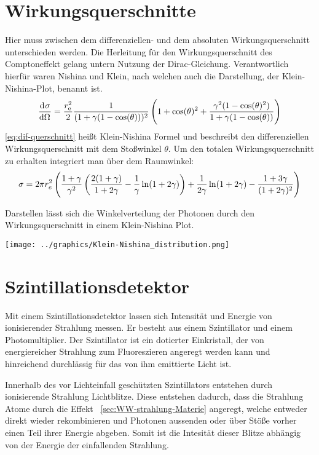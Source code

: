 \documentclass[11pt, ngerman, fleqn, DIV=15, headinclude, BCOR=2cm]{scrreprt}
\begin{document}
\section{Wirkungsquerschnitte}
Hier muss zwischen dem differenziellen- und dem absoluten Wirkungsquerschnitt
unterschieden werden.
Die Herleitung für den Wirkungsquerschnitt des Comptoneffekt gelang untern
Nutzung der Dirac-Gleichung. Verantwortlich hierfür waren Nishina und
Klein, nach welchen auch die Darstellung, der Klein-Nishina-Plot, benannt ist.
\[
    \dod \sigma\Omega = \frac{r^2_\text{e}}{2}
    \frac{1}{(1+\gamma(1-\cos(\theta)))^2}\del{1+\cos(\theta)^2+\frac{\gamma^2(1-\cos(\theta)^2)}{1+\gamma(1-\cos(\theta))}}
\]
\label{eq:dif-querschnitt}
\ref{eq:dif-querschnitt} heißt Klein-Nishina Formel und beschreibt den
differenziellen Wirkungsquerschnitt mit dem Stoßwinkel $\theta$.
Um den totalen Wirkungsquerschnitt zu erhalten integriert man über dem
Raumwinkel:
\[
    \sigma = 2\pi r^2_e
    \del{\frac{1+\gamma}{\gamma^2}\del{\frac{2(1+\gamma)}{1+2\gamma}-\frac
        1\gamma\ln(1+2\gamma)}+\frac
    1{2\gamma}\ln(1+2\gamma)-\frac{1+3\gamma}{(1+2\gamma)^2}}
\]

Darstellen lässt sich die Winkelverteilung der Photonen durch den Wirkungsquerschnitt in einem
Klein-Nishina Plot. 

\texttt{[image: ../graphics/Klein-Nishina\_distribution.png]}
\parencite{klein-nishina}

\section{Szintillationsdetektor}
Mit einem Szintillationsdetektor lassen sich Intensität und Energie von
ionisierender Strahlung messen.
Er besteht aus einem Szintillator und einem Photomultiplier.
Der Szintillator ist ein dotierter Einkristall, der von energiereicher
Strahlung zum Fluoreszieren angeregt werden kann und hinreichend
durchlässig für das von ihm emittierte Licht ist.

Innerhalb des vor Lichteinfall geschützten Szintillators entstehen durch
ionisierende Strahlung Lichtblitze. 
Diese entstehen dadurch, dass die Strahlung Atome durch die Effekt
~\ref{sec:WW-strahlung-Materie} angeregt, welche entweder direkt
wieder rekombinieren und Photonen aussenden oder über Stöße vorher einen Teil
ihrer Energie abgeben.
Somit ist die Intesität dieser Blitze abhängig von der Energie der einfallenden Strahlung.
\end{document}
